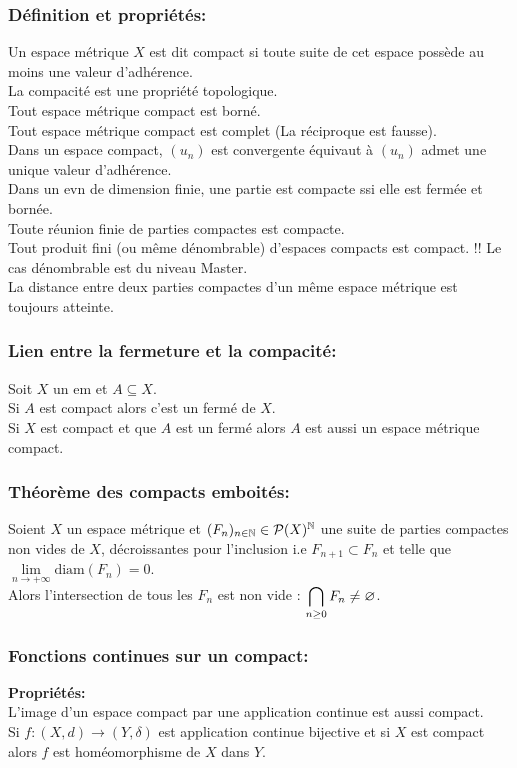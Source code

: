 \documentclass[12pt,a4paper]{article}
\begin{document}
	\subsubsection{Définition et propriétés:}
	Un espace métrique $X$ est dit compact si toute suite de cet espace possède au moins une valeur d'adhérence.\\
	La compacité est une propriété topologique.\\
	Tout espace métrique compact est borné.\\
	Tout espace métrique compact est complet (La réciproque est fausse).\\
	Dans un espace compact, $(u_n)$ est convergente équivaut à $(u_n)$ admet une unique valeur d'adhérence.\\
	Dans un evn de dimension finie, une partie est compacte ssi elle est fermée et bornée.\\
	Toute réunion finie de parties compactes est compacte.\\
	Tout produit fini (ou même dénombrable) d'espaces compacts est compact. !! Le cas dénombrable est du niveau Master.\\
	La distance entre deux parties compactes d'un même espace métrique est toujours atteinte.
	
	\subsubsection{Lien entre la fermeture et la compacité:} Soit $X$ un em et $A\subseteq X$.\\
	Si $A$ est compact alors c'est un fermé de $X$.\\
	Si $X$ est compact et que $A$ est un fermé alors $A$ est aussi un espace métrique compact.
	
	\subsubsection{Théorème des compacts emboités:} Soient $X$ un espace métrique et $(F_n)_{n\in \mathbb{N}}\in \mathcal{P}(X)^{\mathbb{N}}$ une suite de parties compactes non vides de $X$, décroissantes pour l'inclusion i.e $F_{n+1} \subset F_n$ et telle que $\lim\limits_{n\to +\infty} \text{diam}(F_n)=0$.\\
	Alors l'intersection de tous les $F_n$ est non vide : $\displaystyle \bigcap\limits_{n\geq 0} F_n\neq \varnothing $.
	
	\subsubsection{Fonctions continues sur un compact:}
	\textbf{Propriétés:}\\
	L'image d'un espace compact par une application continue est aussi compact.\\
	Si $f:(X,d)\longrightarrow (Y,\delta)$ est application continue bijective et si $X$ est compact alors $f$ est homéomorphisme de $X$ dans $Y$.\\
	
\end{document}
